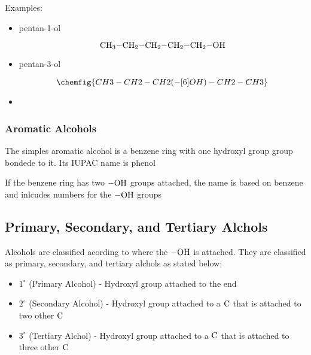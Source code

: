 \documentclass[12pt, a4paper]{article}
\newcommand{\C}{\ce{C}}
\begin{document}
    \noindent Examples:

    \begin{itemize}
        
        \item pentan-1-ol 
        
        \[
            \ce{CH3-CH2-CH2-CH2-CH2-OH}    
        \]

        \item pentan-3-ol
        
        \[
            \chemfig{CH3-CH2-CH2(-[6]OH)-CH2-CH3}    
        \]

        \item 

    \end{itemize}

    \subsubsection{Aromatic Alcohols}

    The simples aromatic alcohol is a benzene ring with one hydroxyl group group
    bondede to it. Its IUPAC name is phenol

    \begin{center}
    \end{center}

    If the benzene ring has two $\ce{-OH}$ groups attached, the name is based on benzene
    and inlcudes numbers for the $\ce{-OH}$ groups

    \begin{center}
    \end{center}

    \subsection{Primary, Secondary, and Tertiary Alchols}

    Alcohols are classified acording to where the $\ce{-OH}$ is attached. They
    are classified as primary, secondary, and tertiary alchols as stated below:

    \begin{itemize}
        \item $1^{\circ}$ (Primary Alcohol) - Hydroxyl group attached to the end 
        \item $2^{\circ}$ (Secondary Alcohol) - Hydroxyl group attached to a $\ce{C}$ that is attached
                          to two other $\ce{C}$%
        \item $3^{\circ}$ (Tertiary Alchol) - Hydroxyl group attached to a $\C$ that is attached to
                          three other $\C$
    \end{itemize}
\end{document}
